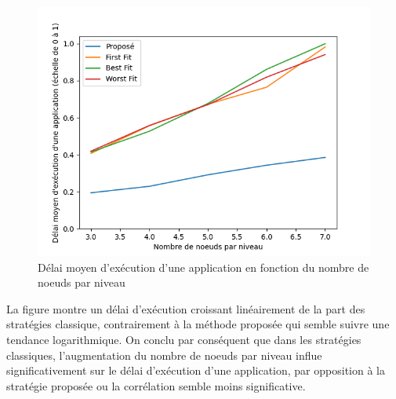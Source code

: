 \begin{figure}[H]
    \centering
    \includegraphics[]{src/ressources/loopDelayPerLvl.png}
    \caption{Délai moyen d'exécution d’une application en fonction du nombre de noeuds par niveau}
    \label{fig:}
\end{figure}

La figure montre un délai d'exécution croissant linéairement de la part des stratégies classique, contrairement à la méthode proposée qui semble suivre une tendance logarithmique. On conclu par conséquent que dans les stratégies classiques, l'augmentation du nombre de noeuds par niveau influe significativement sur le délai d'exécution d'une application, par opposition à la stratégie proposée ou la corrélation semble moins significative.   


